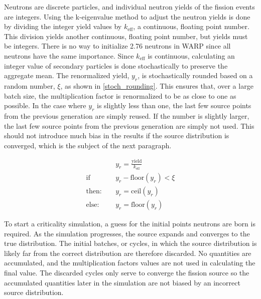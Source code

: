 
Neutrons are discrete particles, and individual neutron yields of the fission events are integers.  Using the k-eigenvalue method to adjust the neutron yields is done by dividing the integer yield values by $k_\mathrm{eff}$, a continuous, floating point number.  This division yields another continuous, floating point number, but yields must be integers.  There is no way to initialize 2.76 neutrons in WARP since all neutrons have the same importance.  Since $k_\mathrm{eff}$ is continuous, calculating an integer value of secondary particles is done stochastically to preserve the aggregate mean.  The renormalized yield, $y_r$, is stochastically rounded based on a random number, $\xi$, as shown in  \eqref{stoch_rounding}.  This ensures that, over a large batch size, the multiplication factor is renormalized to be as close to one as possible.  In the case where $y_r$ is slightly less than one, the last few source points from the previous generation are simply reused. If the number is slightly larger, the last few source points from the previous generation are simply not used. %
 This should not introduce much bias in the results if the source distribution is converged, which is the subject of the next paragraph.

\begin{equation}
\label{stoch_rounding}
\begin{split}
&y_r = \frac{\mathrm{yield}}{k_\mathrm{eff}} \\
\mathrm{if}\quad &y_r - \mathrm{floor}(y_r)<\xi \\
\mathrm{then:}\quad &y_r=\mathrm{ceil}(y_r) \\
\mathrm{else:}\quad &y_r=\mathrm{floor}(y_r)
\end{split}
\end{equation}

To start a criticality simulation, a guess for the initial points neutrons are born is required. As the simulation progresses, the source expands and converges to the true distribution.  The initial batches, or cycles, in which the source distribution is likely far from the correct distribution are therefore discarded.  No quantities are accumulated, and the multiplication factors values are not used in calculating the final value.  The discarded cycles only serve to converge the fission source so the accumulated quantities later in the simulation are not biased by an incorrect source distribution.  

